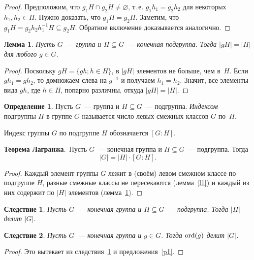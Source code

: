 \documentclass[a4paper,10pt]{amsart}
\def\ord{{\rm ord}}%
\def\ord{{\rm ord}}
\def\ord{{\rm ord}}
\newtheorem{lemma}{Лемма}
\newtheorem{corollary}{Следствие}
\theoremstyle{definition}
\newtheorem{definition}{Определение}
\theoremstyle{remark}
\begin{document}
\begin{proof}
Предположим, что $g_1H\cap g_2H\ne\varnothing$, т.\,е.
$g_1h_1=g_2h_2$ для некоторых $h_1,h_2\in H$. Нужно доказать, что
$g_1H=g_2H$. Заметим, что $g_1H=g_2h_2h_1^{-1}H\subseteq g_2H$.
Обратное включение доказывается аналогично.
\end{proof}

\begin{lemma} \label{l2}
Пусть $G$~--- группа и $H\subseteq G$~--- конечная подгруппа. Тогда
$|gH|=|H|$ для любого $g\in G$.
\end{lemma}

\begin{proof}
Поскольку $gH=\{gh ; h\in H\}$, в $|gH|$ элементов не больше, чем
в~$H$. Если $gh_1=gh_2$, то домножаем слева на $g^{-1}$ и получаем
$h_1=h_2$. Значит, все элементы вида $gh$, где $h\in H$, попарно
различны, откуда $|gH|=|H|$.
\end{proof}

\begin{definition}
Пусть $G$~--- группа и $H\subseteq G$~--- подгруппа. {\it Индексом}
подгруппы $H$ в группе $G$ называется число левых смежных классов
$G$ по~$H$.
\end{definition}

Индекс группы $G$ по подгруппе $H$ обозначается $[G:H]$.

\smallskip

{\bf Теорема Лагранжа}.\ Пусть $G$~--- конечная группа и $H\subseteq
G$~--- подгруппа. Тогда
$$
|G| = |H| \cdot [G:H].
$$

\begin{proof}
Каждый элемент группы $G$ лежит в (своём) левом смежном классе по
подгруппе $H$, разные смежные классы не пересекаются
(лемма~\ref{l1}) и каждый из них содержит по $|H|$ элементов
(лемма~\ref{l2}).
\end{proof}

\begin{corollary} \label{c1}
Пусть $G$~--- конечная группа и $H\subseteq G$~--- подгруппа. Тогда
$|H|$ делит $|G|$.
\end{corollary}

\begin{corollary} \label{c2}
Пусть $G$~--- конечная группа и $g\in G$. Тогда $\ord(g)$ делит
$|G|$.
\end{corollary}

\begin{proof}
Это вытекает из следствия~\ref{c1} и предложения~\ref{p1}.
\end{proof}
\end{document}
